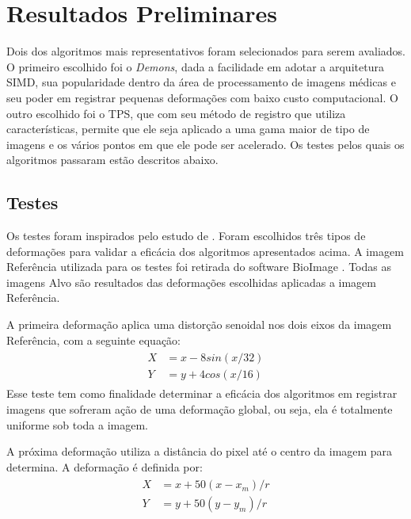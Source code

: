 \chapter{Resultados Preliminares}
\label{cap:resultados}
	Dois dos algoritmos mais representativos foram selecionados para serem avaliados. 
O primeiro escolhido foi o \textit{Demons}, dada a facilidade em adotar a arquitetura SIMD, sua popularidade 
dentro da área de processamento de imagens médicas e seu poder em registrar pequenas deformações com baixo custo 
computacional. O outro escolhido foi o TPS, que com seu método de registro que utiliza características, permite que ele
seja aplicado a uma gama maior de tipo de imagens e os vários pontos em que ele pode ser acelerado. Os testes pelos 
quais os algoritmos passaram estão descritos abaixo.

\section{Testes}
	Os testes foram inspirados pelo estudo de \cite{zagorchev2006comparative}. Foram escolhidos três tipos
de deformações para validar a eficácia dos algoritmos apresentados acima. A imagem Referência utilizada para os
testes foi retirada do software BioImage \cite{papademetris2005bioimage}. Todas as imagens Alvo são resultados
das deformações escolhidas aplicadas a imagem Referência.

	A primeira deformação aplica uma distorção senoidal nos dois eixos da imagem Referência, com a
seguinte equação:
\begin{align} \label{math:sin}
\begin{split}
	X &= x - 8sin(x/32) \\
	Y &= y + 4cos(x/16)
\end{split}  	
\end{align}
	Esse teste tem como finalidade determinar a eficácia dos algoritmos em registrar imagens que sofreram
ação de uma deformação global, ou seja, ela é totalmente uniforme sob toda a imagem.

	A próxima deformação utiliza a distância do pixel até o centro da imagem para determina. A deformação
é definida por:
\begin{align} \label{math:dist}
\begin{split}
	X &= x + 50(x-x_m)/r \\
	Y &= y + 50(y-y_m)/r 
\end{split} 
\end{align}

